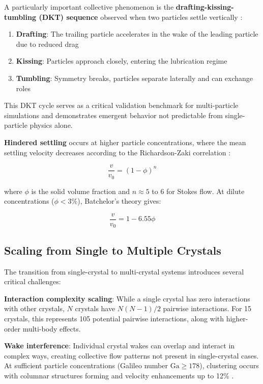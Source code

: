 A particularly important collective phenomenon is the \textbf{drafting-kissing-tumbling (DKT) sequence} observed when two particles settle vertically \cite{fortes1987nonlinear}:

\begin{enumerate}
    \item \textbf{Drafting}: The trailing particle accelerates in the wake of the leading particle due to reduced drag
    \item \textbf{Kissing}: Particles approach closely, entering the lubrication regime
    \item \textbf{Tumbling}: Symmetry breaks, particles separate laterally and can exchange roles
\end{enumerate}

This DKT cycle serves as a critical validation benchmark for multi-particle simulations and demonstrates emergent behavior not predictable from single-particle physics alone.

\textbf{Hindered settling} occurs at higher particle concentrations, where the mean settling velocity decreases according to the Richardson-Zaki correlation \cite{happel1983low}:

\begin{equation}
\frac{v}{v_0} = (1-\phi)^n
\label{eq:richardson_zaki}
\end{equation}

where $\phi$ is the solid volume fraction and $n \approx 5$ to 6 for Stokes flow. At dilute concentrations ($\phi < 3\%$), Batchelor's theory gives:

\begin{equation}
\frac{v}{v_0} = 1 - 6.55\phi
\end{equation}

\subsection{Scaling from Single to Multiple Crystals}

The transition from single-crystal to multi-crystal systems introduces several critical challenges:

\textbf{Interaction complexity scaling}: While a single crystal has zero interactions with other crystals, $N$ crystals have $N(N-1)/2$ pairwise interactions. For 15 crystals, this represents 105 potential pairwise interactions, along with higher-order multi-body effects.

\textbf{Wake interference}: Individual crystal wakes can overlap and interact in complex ways, creating collective flow patterns not present in single-crystal cases. At sufficient particle concentrations (Galileo number $\text{Ga} \geq 178$), clustering occurs with columnar structures forming and velocity enhancements up to 12\% \cite{uhlmann2014clustering}.

